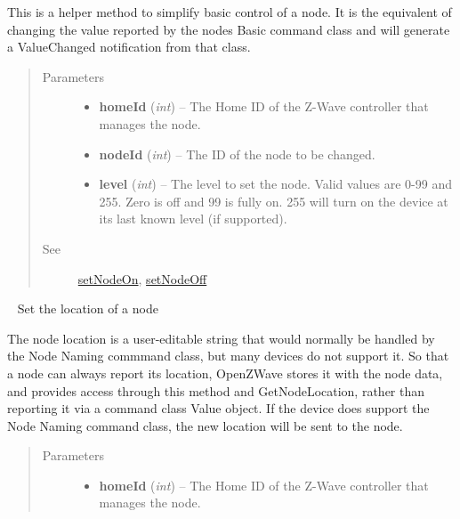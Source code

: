 \documentclass[letterpaper,10pt,english]{sphinxmanual}
\begin{document}
\begin{fulllineitems}
\begin{fulllineitems}
This is a helper method to simplify basic control of a node.  It is the
equivalent of changing the value reported by the nodes Basic command class
and will generate a ValueChanged notification from that class.
\begin{quote}\begin{description}
\item[{Parameters}] \leavevmode\begin{itemize}
\item {} 
\textbf{homeId} (\emph{int}) -- The Home ID of the Z-Wave controller that manages the node.

\item {} 
\textbf{nodeId} (\emph{int}) -- The ID of the node to be changed.

\item {} 
\textbf{level} (\emph{int}) -- The level to set the node.  Valid values are 0-99 and 255.  Zero is off and 99 is fully on.  255 will turn on the device at its last known level (if supported).

\end{itemize}

\item[{See}] \leavevmode
{\hyperref[libopenzwave:setnodeon]{setNodeOn}}, {\hyperref[libopenzwave:setnodeoff]{setNodeOff}}

\end{description}\end{quote}

\end{fulllineitems}


\begin{fulllineitems}
\label{libopenzwave:libopenzwave.PyManager.setNodeLocation}~\label{libopenzwave:setnodelocation}
Set the location of a node

The node location is a user-editable string that would normally be handled by
the Node Naming commmand class, but many devices do not support it.  So that a
node can always report its location, OpenZWave stores it with the node data,
and provides access through this method and GetNodeLocation, rather than
reporting it via a command class Value object.  If the device does support the
Node Naming command class, the new location will be sent to the node.
\begin{quote}\begin{description}
\item[{Parameters}] \leavevmode\begin{itemize}
\item {} 
\textbf{homeId} (\emph{int}) -- The Home ID of the Z-Wave controller that manages the node.


\end{itemize}
\end{description}
\end{quote}
\end{fulllineitems}
\end{fulllineitems}
\end{document}
